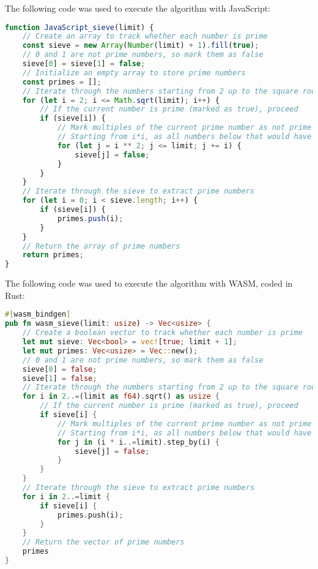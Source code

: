 The following code was used to execute the algorithm with JavaScript:
\begin{lstlisting}[language=JavaScript, caption={Sieve of Eratosthenes in JavaScript, source: self-coded}]
function JavaScript_sieve(limit) {
    // Create an array to track whether each number is prime
    const sieve = new Array(Number(limit) + 1).fill(true);
    // 0 and 1 are not prime numbers, so mark them as false
    sieve[0] = sieve[1] = false;
    // Initialize an empty array to store prime numbers
    const primes = [];
    // Iterate through the numbers starting from 2 up to the square root of the limit
    for (let i = 2; i <= Math.sqrt(limit); i++) {
        // If the current number is prime (marked as true), proceed
        if (sieve[i]) {
            // Mark multiples of the current prime number as not prime
            // Starting from i*i, as all numbers below that would have been already marked
            for (let j = i ** 2; j <= limit; j += i) {
                sieve[j] = false;
            }
        }
    }
    // Iterate through the sieve to extract prime numbers
    for (let i = 0; i < sieve.length; i++) {
        if (sieve[i]) {
            primes.push(i);
        }
    }
    // Return the array of prime numbers
    return primes;
}
\end{lstlisting}

The following code was used to execute the algorithm with WASM, coded in Rust:
\begin{lstlisting}[language=Rust, caption={Sieve of Eratosthenes in Rust, source: self-coded}]
#[wasm_bindgen]
pub fn wasm_sieve(limit: usize) -> Vec<usize> {
    // Create a boolean vector to track whether each number is prime
    let mut sieve: Vec<bool> = vec![true; limit + 1];
    let mut primes: Vec<usize> = Vec::new();
    // 0 and 1 are not prime numbers, so mark them as false
    sieve[0] = false;
    sieve[1] = false;
    // Iterate through the numbers starting from 2 up to the square root of the limit
    for i in 2..=(limit as f64).sqrt() as usize {
        // If the current number is prime (marked as true), proceed
        if sieve[i] {
            // Mark multiples of the current prime number as not prime
            // Starting from i*i, as all numbers below that would have been already marked
            for j in (i * i..=limit).step_by(i) {
                sieve[j] = false;
            }
        }
    }
    // Iterate through the sieve to extract prime numbers
    for i in 2..=limit {
        if sieve[i] {
            primes.push(i);
        }
    }
    // Return the vector of prime numbers
    primes
}
\end{lstlisting}

